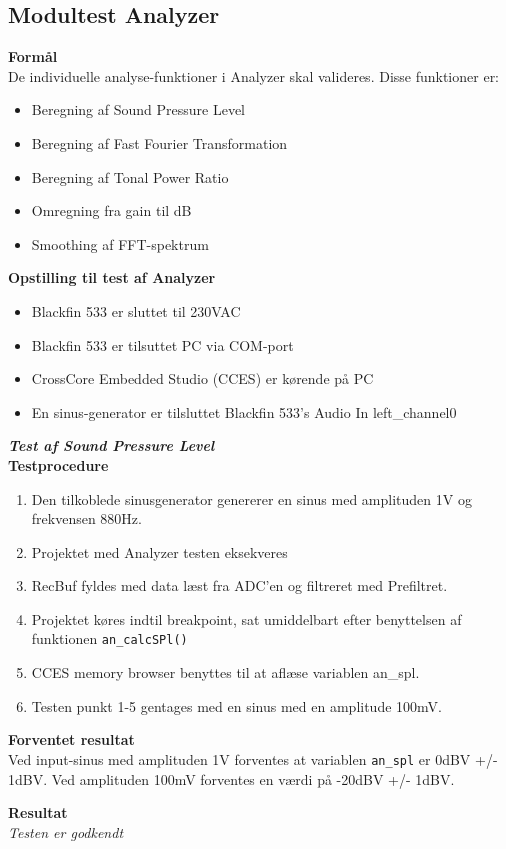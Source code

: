 \subsection{Modultest Analyzer}

\textbf{Formål} \\
De individuelle analyse-funktioner i Analyzer skal valideres. Disse funktioner er:
\begin{itemize}
	\item Beregning af Sound Pressure Level
	\item Beregning af Fast Fourier Transformation
	\item Beregning af Tonal Power Ratio
	\item Omregning fra gain til dB
	\item Smoothing af FFT-spektrum
\end{itemize}

\textbf{Opstilling til test af Analyzer}
\begin{itemize}
	\item Blackfin 533 er sluttet til 230VAC
	\item Blackfin 533 er tilsuttet PC via COM-port
	\item CrossCore Embedded Studio (CCES) er kørende på PC
	\item En sinus-generator er tilsluttet Blackfin 533's Audio In left\_channel0
\end{itemize}

\textit{\textbf{Test af Sound Pressure Level}}\\
\textbf{Testprocedure}
\begin{enumerate}
	\item Den tilkoblede sinusgenerator genererer en sinus med amplituden 1V og frekvensen 880Hz.	
	\item Projektet med Analyzer testen eksekveres 
	\item RecBuf fyldes med data læst fra ADC'en og filtreret med Prefiltret.
	\item Projektet køres indtil breakpoint, sat umiddelbart efter benyttelsen af funktionen \verb+an_calcSPl()+
	\item CCES memory browser benyttes til at aflæse variablen an\_spl. 
	\item Testen punkt 1-5 gentages med en sinus med en amplitude 100mV.
\end{enumerate}

\textbf{Forventet resultat} \\
Ved input-sinus med amplituden 1V forventes at variablen \verb+an_spl+ er 0dBV +/- 1dBV. Ved amplituden 100mV forventes en værdi på -20dBV +/- 1dBV.

\textbf{Resultat} \\


\textit{Testen er godkendt}





